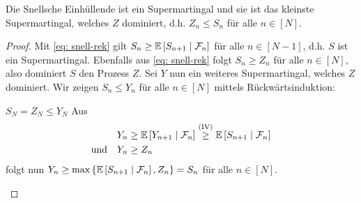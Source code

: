 \begin{theorem} %
	\label{theorem: 6.3}
	Die Snellsche Einhüllende ist ein Supermartingal und sie ist das kleinste Supermartingal, welches $Z$ dominiert, d.h. $Z_n \le S_n$ für alle $n \in [N]$.
\end{theorem}
\begin{proof}
	Mit \eqref{eq: snell-rek} gilt $S_n \ge \mathbb{E} \left[ S_{n+1} \mid \mathcal{F}_n \right]$ für alle $n \in [N-1]$, d.h. $S$ ist ein Supermartingal. Ebenfalls aus \eqref{eq: snell-rek} folgt $S_n \ge Z_n$ für alle $n \in [N]$, also dominiert $S$ den Prozess $Z$. Sei $Y$ nun ein weiteres Supermartingal, welches $Z$ dominiert. Wir zeigen $S_n \le Y_n$ für alle $n \in [N]$ mittels Rückwärtsinduktion:
	\begin{description}
		\ianfang[$n = N$] $S_N = Z_N \le Y_N$
		\ischritt[$n+1 \to n$] Aus
		\begin{equation*}
			\begin{aligned}
			Y_n &\ge \mathbb{E} \left[ Y_{n+1} \mid \mathcal{F}_n \right] \overset{\text{(IV)}}{\ge} \mathbb{E} \left[ S_{n+1} \mid \mathcal{F}_n \right] \\
			\text{und} \quad Y_n &\ge Z_n
			\end{aligned}
		\end{equation*}
		folgt nun $Y_n \ge \max\left\{ \mathbb{E} \left[ S_{n+1} \mid \mathcal{F}_n \right], Z_n \right\} = S_n$ für alle $n \in [N]$.
	\end{description}
\end{proof}

